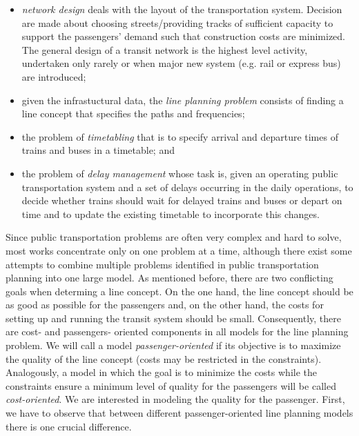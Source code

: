 \documentclass[
  twoside,
  11pt, a4paper,
  footinclude=true,
  headinclude=true,
  cleardoublepage=empty
]{book}
\theoremstyle{definition}
\begin{document}
\begin{itemize}
\item \emph{network design} deals with the layout of the transportation system. Decision are made about choosing streets/providing tracks of sufficient capacity to support the passengers' demand such that construction costs are minimized. The general design of a transit network is the highest level activity, undertaken only rarely or when major new system (e.g. rail or express bus) are introduced;
\item given the infrastuctural data, the \emph{line planning problem} consists of finding a line concept that specifies the paths and frequencies;
\item the problem of \emph{timetabling} that is to specify arrival and departure times of trains and buses  in a timetable; and
\item the problem of \emph{delay management} whose task is, given an operating public transportation system and a set of delays occurring in the daily operations, to decide whether trains should wait for delayed trains and buses or depart on time and to update the existing timetable to incorporate this changes.
\end{itemize}
Since public transportation problems are often very complex and hard to solve, most works concentrate only on one problem at a time, although there exist some attempts to combine multiple problems identified in public transportation planning into one large model. \newline
As mentioned before, there are two conflicting goals when determing a line concept. On the one hand, the line concept should be as good as possible for the passengers and, on the other hand, the costs for setting up and running the transit system should be small. Consequently, there are cost- and passengers- oriented components in all models for the line planning problem. We will call a model \emph{passenger-oriented} if its objective is to maximize the quality of the line concept (costs may be restricted in the constraints). Analogously, a model in which the goal is to minimize the costs while the constraints ensure a minimum level of quality for the passengers will be called \emph{cost-oriented}. \newline
We are interested in modeling the quality for the passenger. \newline
First, we have to observe that between different passenger-oriented line planning models there is one crucial difference. \newline
\end{document}
